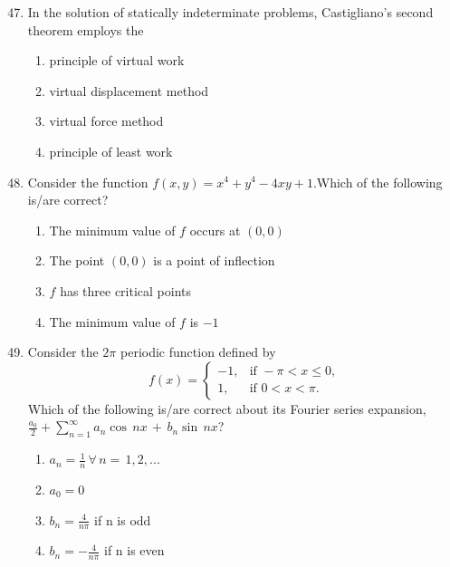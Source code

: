 \documentclass[journal]{IEEEtran}
\theoremstyle{remark}
\begin{document}
\begin{enumerate}[itemsep=1em]
\setcounter{enumi}{46}
\item In the solution of statically indeterminate problems, Castigliano's second theorem employs the

\begin{enumerate}[label=\Alph*), leftmargin=2.5em, labelsep=0.5em, itemsep=0.5em]
    \item principle of virtual work 
    \item virtual displacement method 
    \item virtual force method 
    \item principle of least work
\end{enumerate}

\end{enumerate}

\begin{enumerate}[itemsep=1em]
\setcounter{enumi}{47}
\item Consider the function $f(x,y)=x^4+y^4-4xy+1$.Which of the following is/are correct? 
\begin{enumerate}[label=\Alph*), leftmargin=2.5em, labelsep=0.5em, itemsep=0.5em]
    \item The minimum value of $f$ occurs at $(0,0)$  
    \item The point $(0,0)$ is a point of inflection 
    \item $f$ has three critical points 
    \item The minimum value of $f$ is $-1$
\end{enumerate}
\end{enumerate}

\newpage
\vspace*{0.25cm}

\begin{enumerate}[itemsep=1em]
\setcounter{enumi}{48}
\item Consider the $2\pi$ periodic function defined by
\[
f(x) =
\begin{cases}
-1, & \text{if } -\pi < x \le 0, \\
1, & \text{if } 0 < x < \pi.
\end{cases}
\]
Which of the following is/are correct about its Fourier series expansion, $\frac{a_0}{2}+\sum_{n=1}^{\infty}a_n\cos\,nx\,+\,b_n\sin\,nx$?

\begin{enumerate}[label=\Alph*), leftmargin=2.5em, labelsep=0.5em, itemsep=0.5em]
      \item $a_n=\frac{1}{n}\,\forall\,n=\,1,2,...$
      \item $a_0=0$
      \item $b_n=\frac{4}{n\pi}$ if n is odd
      \item $b_n=-\frac{4}{n\pi}$ if n is even
\end{enumerate}
\end{enumerate}
\end{document}
